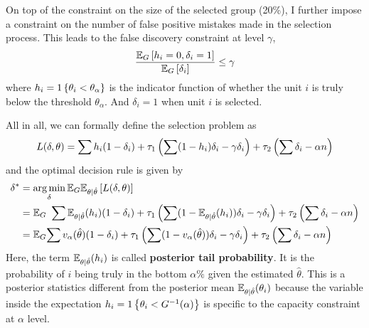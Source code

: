 \documentclass[12pt]{article}
\begin{document}
On top of the constraint on the size of the selected group (20\%), I further
impose a constraint on the number of false positive mistakes made in the
selection process. This leads to the false discovery constraint at level
$\gamma$,
\begin{equation*}
    \frac{\mathbb{E}_G\left[h_i=0,\delta_i=1\right]}{\mathbb{E}_G\left[\delta_i\right]} \le \gamma
\end{equation*} where $h_i=1\left\{\theta_i<\theta_\alpha\right\}$ is the indicator function of whether the unit $i$ is truly below the threshold $\theta_\alpha$. And $\delta_i=1$ when unit $i$ is selected.

All in all, we can formally define the selection problem as
\begin{equation*}
    L(\delta,\theta)=\sum h_i(1-\delta_i) +\tau_1\left(\sum (1-h_i)\delta_i -\gamma \delta_i\right) + \tau_2 \left(\sum \delta_i -\alpha n\right)
\end{equation*}
and the optimal decision rule is given by
\begin{equation*}
    \begin{split}
        \delta^*& =\operatorname*{arg\,min}_\delta \mathbb{E}_G\mathbb{E}_{\theta|\hat{\theta}}\left[L(\delta,\theta)\right]                                                                                                       \\
        &= \mathbb{E}_G \ \sum \mathbb{E}_{\theta|\hat{\theta}}(h_i)(1-\delta_i) +\tau_1\left(\sum (1-\mathbb{E}_{\theta|\hat{\theta}}(h_i))\delta_i -\gamma \delta_i\right) + \tau_2 \left(\sum \delta_i -\alpha n\right)            \\
        & =\mathbb{E}_G{\sum v_\alpha(\hat{\theta})(1-\delta_i) +\tau_1\left(\sum (1-v_\alpha(\hat{\theta}))\delta_i -\gamma \delta_i\right) + \tau_2 \left(\sum \delta_i -\alpha n\right)}
    \end{split}
\end{equation*}
Here, the term $\mathbb{E}_{\theta|\hat{\theta}}(h_i)$ is called \textbf{posterior tail probability}. It is the probability of $i$ being truly in the bottom $\alpha\%$ given the estimated $\hat{\theta}$.
This is a posterior statistics different from the posterior mean $\mathbb{E}_{\theta|\hat{\theta}}(\theta_i)$ because the variable inside the expectation $h_i=1\left\{\theta_i<G^{-1}(\alpha)\right\}$ is specific to the capacity constraint at $\alpha$ level.
\end{document}
